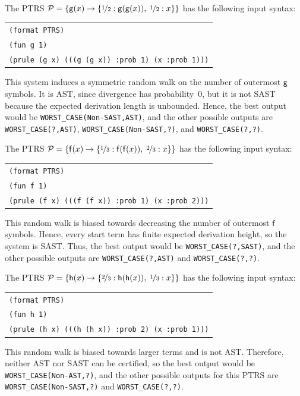 \begin{example}
The PTRS $\mathcal{P} = \{\mathsf{g}(x) \to \{\nicefrac{1}{2}:\mathsf{g}(\mathsf{g}(x)),\; \nicefrac{1}{2}:x\}\}$
has the following input syntax:
\begin{center}
\begin{tabular}{l}
\texttt{(format PTRS)} \\
\texttt{(fun g 1)} \\
\texttt{(prule (g x) (((g (g x)) :prob 1) (x :prob 1)))}
\end{tabular}
\end{center}
This system induces a symmetric random walk on the number of outermost $\mathsf{g}$ symbols.
It is AST, since divergence has probability~$0$, but it is not SAST 
because the expected derivation length is unbounded.
Hence, the best output would be \texttt{WORST\_CASE(Non-SAST,AST)},
and the other possible outputs are \texttt{WORST\_CASE(?,AST)}, \texttt{WORST\_CASE(Non-SAST,?)}, and \texttt{WORST\_CASE(?,?)}.

The PTRS $\mathcal{P} = \{\mathsf{f}(x) \to \{\nicefrac{1}{3}:\mathsf{f}(\mathsf{f}(x)),\; \nicefrac{2}{3}:x\}\}$
has the following input syntax:
\begin{center}
\begin{tabular}{l}
\texttt{(format PTRS)} \\
\texttt{(fun f 1)} \\
\texttt{(prule (f x) (((f (f x)) :prob 1) (x :prob 2)))}
\end{tabular}
\end{center}
This random walk is biased towards decreasing the number of outermost $\mathsf{f}$ symbols.
Hence, every start term has finite expected derivation height, so the system is SAST.
Thus, the best output would be \texttt{WORST\_CASE(?,SAST)},
and the other possible outputs are \texttt{WORST\_CASE(?,AST)} and \texttt{WORST\_CASE(?,?)}.

The PTRS $\mathcal{P} = \{\mathsf{h}(x) \to \{\nicefrac{2}{3}:\mathsf{h}(\mathsf{h}(x)),\; \nicefrac{1}{3}:x\}\}$
has the following input syntax:
\begin{center}
\begin{tabular}{l}
\texttt{(format PTRS)} \\
\texttt{(fun h 1)} \\
\texttt{(prule (h x) (((h (h x)) :prob 2) (x :prob 1)))}
\end{tabular}
\end{center}
This random walk is biased towards larger terms and is not AST.
Therefore, neither AST nor SAST can be certified,
so the best output would be \texttt{WORST\_CASE(Non-AST,?)},
and the other possible outputs for this PTRS are \texttt{WORST\_CASE(Non-SAST,?)} and \texttt{WORST\_CASE(?,?)}.
\end{example}

